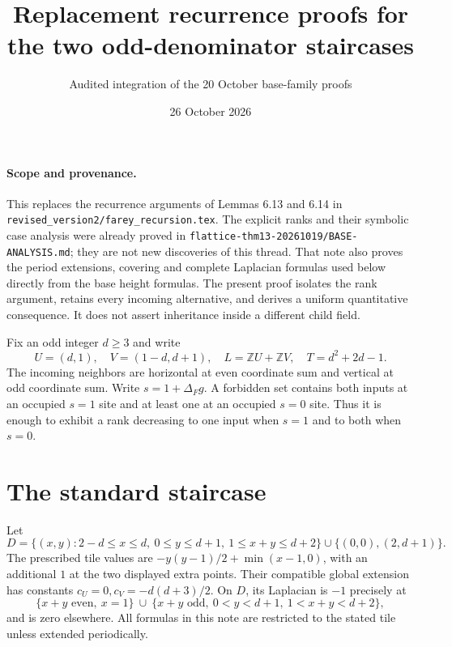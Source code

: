 \documentclass[11pt]{article}
\title{Replacement recurrence proofs for the two odd-denominator staircases}
\author{Audited integration of the 20 October base-family proofs}
\date{26 October 2026}
\newcommand{\Z}{\mathbb Z}
\begin{document}
\maketitle

\paragraph{Scope and provenance.}
This replaces the recurrence arguments of Lemmas 6.13 and 6.14 in
\texttt{revised\_version2/farey\_recursion.tex}. The explicit ranks and
their symbolic case analysis were already proved in
\texttt{flattice-thm13-20261019/BASE-ANALYSIS.md}; they are not new
discoveries of this thread. That note also proves the period extensions,
covering and complete Laplacian formulas used below directly from the
base height formulas. The present proof isolates the rank argument,
retains every incoming alternative, and derives a uniform quantitative
consequence. It does not assert inheritance inside a different child field.

Fix an odd integer $d\ge3$ and write
\[
 U=(d,1),\quad V=(1-d,d+1),\quad L=\Z U+\Z V,\quad
 T=d^2+2d-1.
\]
The incoming neighbors are horizontal at even coordinate sum and vertical
at odd coordinate sum. Write $s=1+\Delta_F g$. A forbidden set contains
both inputs at an occupied $s=1$ site and at least one at an occupied
$s=0$ site. Thus it is enough to exhibit a rank decreasing to one
input when $s=1$ and to both when $s=0$.

\section*{The standard staircase}
Let
\[
 D=\{(x,y):2-d\le x\le d,\ 0\le y\le d+1,\ 1\le x+y\le d+2\}
       \cup\{(0,0),(2,d+1)\}.
\]
The prescribed tile values are
$-y(y-1)/2+\min(x-1,0)$, with an additional $1$ at the two displayed
extra points. Their compatible global extension has constants
$c_U=0,c_V=-d(d+3)/2$. On $D$, its Laplacian is $-1$ precisely at
\[
 \{x+y\text{ even},\ x=1\}
 \ \cup\
 \{x+y\text{ odd},\ 0<y<d+1,\ 1<x+y<d+2\},                 \tag{1}
\]
and is zero elsewhere. All formulas in this note are restricted to the
stated tile unless extended periodically.
\end{document}
